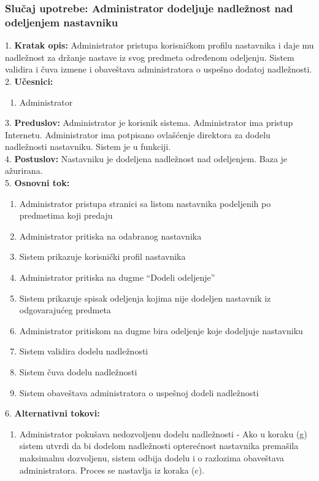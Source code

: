 \documentclass{article}
\begin{document}
\newpage
\subsubsection{Slučaj upotrebe: Administrator dodeljuje nadležnost nad odeljenjem nastavniku}
1. \textbf{Kratak opis:} Administrator pristupa korisničkom profilu nastavnika i daje mu nadležnost za držanje nastave iz svog predmeta određenom odeljenju. Sistem validira i čuva izmene i obaveštava administratora o uspešno dodatoj nadležnosti. \\

2. \textbf{Učesnici:}
\begin{enumerate} [label=(\alph*)]
\item Administrator
\end{enumerate} 

3. \textbf{Preduslov:} Administrator je korisnik sistema. Administrator ima pristup Internetu. Administrator ima potpisano ovlašćenje direktora za dodelu nadležnosti nastavniku. Sistem je u funkciji. \\

4. \textbf{Postuslov:} Nastavniku je dodeljena nadležnost nad odeljenjem. Baza je ažurirana. \\

5. \textbf{Osnovni tok:} 
\begin{enumerate} [label=(\alph*)]
\item Administrator pristupa stranici sa listom nastavnika podeljenih po predmetima koji predaju
\item Administrator pritiska na odabranog nastavnika
\item Sistem prikazuje korisnički profil nastavnika
\item Administrator pritiska na dugme ``Dodeli odeljenje''
\item Sistem prikazuje spisak odeljenja kojima nije dodeljen nastavnik iz odgovarajućeg predmeta
\item Administrator pritiskom na dugme bira odeljenje koje dodeljuje nastavniku
\item Sistem validira dodelu nadležnosti
\item Sistem čuva dodelu nadležnosti
\item Sistem obaveštava administratora o uspešnoj dodeli nadležnosti
\end{enumerate}

6. \textbf{Alternativni tokovi:}
\begin{enumerate} [label=(\roman*)]
    \item Administrator pokušava nedozvoljenu dodelu nadležnosti - Ako u koraku (g) sistem utvrdi da bi dodelom nadležnosti opterećnost nastavnika premašila maksimalnu dozvoljenu, sistem odbija dodelu i o razlozima obaveštava administratora. Proces se nastavlja iz koraka (c).
\end{enumerate}
\end{document}
